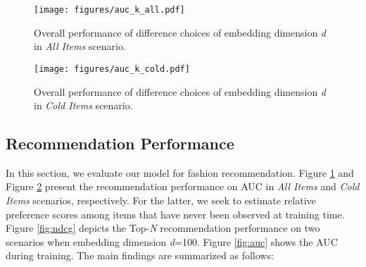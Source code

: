 \documentclass{article}
\begin{document}
\begin{figure}
\texttt{[image: figures/auc\_k\_all.pdf]}\caption{Overall performance of difference choices of embedding dimension \textit{d} in \textit{All Items} scenario.}\label{fig:auc_k_all}
\end{figure}

\begin{figure}
\texttt{[image: figures/auc\_k\_cold.pdf]}\caption{Overall performance of difference choices of embedding dimension \textit{d} in \textit{Cold Items} scenario.}\bigskip
\label{fig:auc_k_cold}
\end{figure}



\subsection{Recommendation Performance}
In this section, we evaluate our model for fashion recommendation. Figure \ref{fig:auc_k_all} and Figure \ref{fig:auc_k_cold} present the recommendation performance on AUC in \textit{All Items} and \textit{Cold Items} scenarios, respectively. For the latter, we seek to estimate relative preference scores among items that have never been observed at training time. Figure \ref{fig:ndcg} depicts the Top-\textit{N} recommendation performance on two scenarios when embedding dimension \textit{d}=100. Figure \ref{fig:auc} shows the AUC during training. The main findings are summarized as follows:
\end{document}
